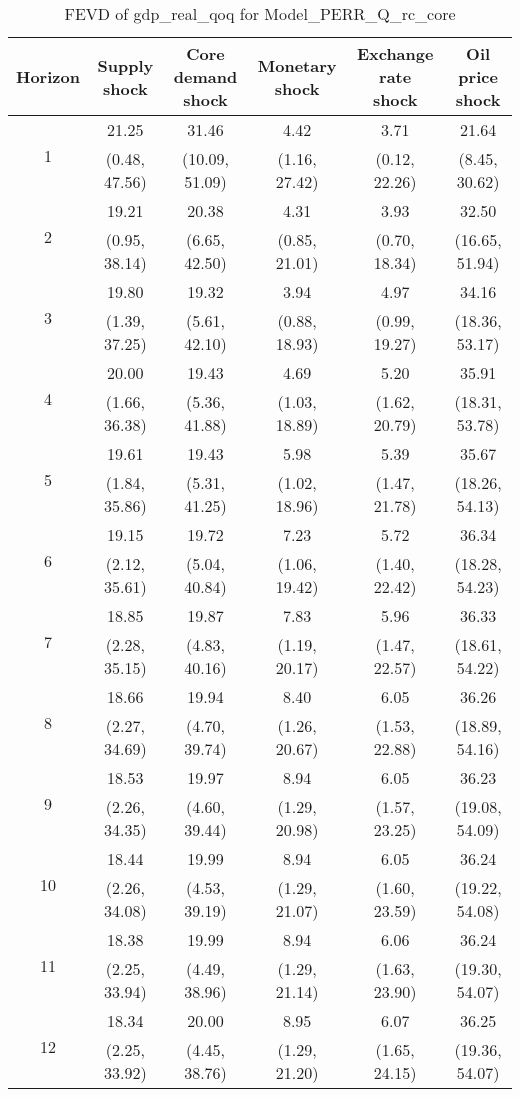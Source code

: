 \documentclass{article}
\begin{document}
\begin{table}
	\footnotesize
	\caption{FEVD of gdp_real_qoq for Model_PERR_Q_rc_core}
	\begin{tabular}{cccccc}
		Horizon & Supply shock & Core demand shock & Monetary shock & Exchange rate shock & Oil price shock\\ \hline
		\multirow{2}{*}{1} & 21.25 & 31.46 & 4.42 & 3.71 & 21.64\\
		 & (0.48, 47.56) & (10.09, 51.09) & (1.16, 27.42) & (0.12, 22.26) & (8.45, 30.62)\\
		\multirow{2}{*}{2} & 19.21 & 20.38 & 4.31 & 3.93 & 32.50\\
		 & (0.95, 38.14) & (6.65, 42.50) & (0.85, 21.01) & (0.70, 18.34) & (16.65, 51.94)\\
		\multirow{2}{*}{3} & 19.80 & 19.32 & 3.94 & 4.97 & 34.16\\
		 & (1.39, 37.25) & (5.61, 42.10) & (0.88, 18.93) & (0.99, 19.27) & (18.36, 53.17)\\
		\multirow{2}{*}{4} & 20.00 & 19.43 & 4.69 & 5.20 & 35.91\\
		 & (1.66, 36.38) & (5.36, 41.88) & (1.03, 18.89) & (1.62, 20.79) & (18.31, 53.78)\\
		\multirow{2}{*}{5} & 19.61 & 19.43 & 5.98 & 5.39 & 35.67\\
		 & (1.84, 35.86) & (5.31, 41.25) & (1.02, 18.96) & (1.47, 21.78) & (18.26, 54.13)\\
		\multirow{2}{*}{6} & 19.15 & 19.72 & 7.23 & 5.72 & 36.34\\
		 & (2.12, 35.61) & (5.04, 40.84) & (1.06, 19.42) & (1.40, 22.42) & (18.28, 54.23)\\
		\multirow{2}{*}{7} & 18.85 & 19.87 & 7.83 & 5.96 & 36.33\\
		 & (2.28, 35.15) & (4.83, 40.16) & (1.19, 20.17) & (1.47, 22.57) & (18.61, 54.22)\\
		\multirow{2}{*}{8} & 18.66 & 19.94 & 8.40 & 6.05 & 36.26\\
		 & (2.27, 34.69) & (4.70, 39.74) & (1.26, 20.67) & (1.53, 22.88) & (18.89, 54.16)\\
		\multirow{2}{*}{9} & 18.53 & 19.97 & 8.94 & 6.05 & 36.23\\
		 & (2.26, 34.35) & (4.60, 39.44) & (1.29, 20.98) & (1.57, 23.25) & (19.08, 54.09)\\
		\multirow{2}{*}{10} & 18.44 & 19.99 & 8.94 & 6.05 & 36.24\\
		 & (2.26, 34.08) & (4.53, 39.19) & (1.29, 21.07) & (1.60, 23.59) & (19.22, 54.08)\\
		\multirow{2}{*}{11} & 18.38 & 19.99 & 8.94 & 6.06 & 36.24\\
		 & (2.25, 33.94) & (4.49, 38.96) & (1.29, 21.14) & (1.63, 23.90) & (19.30, 54.07)\\
		\multirow{2}{*}{12} & 18.34 & 20.00 & 8.95 & 6.07 & 36.25\\
		 & (2.25, 33.92) & (4.45, 38.76) & (1.29, 21.20) & (1.65, 24.15) & (19.36, 54.07)\\
	\end{tabular}
\label{tab:fevd-Model_PERR_Q_rc_core-gdp_real_qoq}
\end{table}
\end{document}

